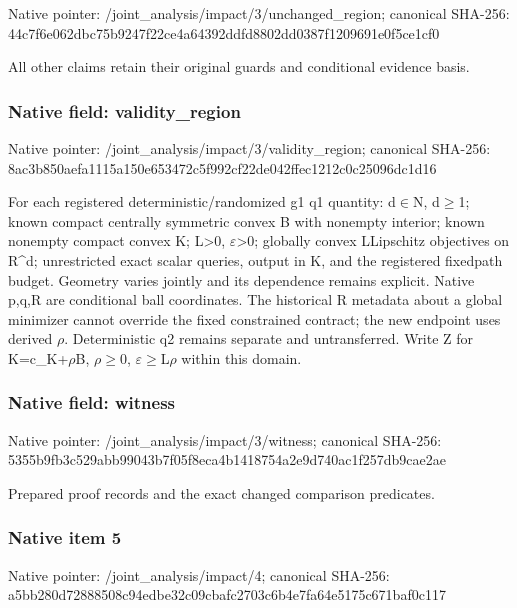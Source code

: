 \documentclass[10pt,a4paper]{article}
\begin{document}
Native pointer: /joint\_analysis/impact/3\allowbreak{}/unchanged\_region; canonical SHA-256: 44c7f6e062dbc75b9247f22c\allowbreak{}e4a64392ddfd8802dd0387f1\allowbreak{}209691e0f5ce1cf0


All other claims retain their original guards and conditional evidence basis.


\subsubsection{Native field: validity\_region}


Native pointer: /joint\_analysis/impact/3\allowbreak{}/validity\_region; canonical SHA-256: 8ac3b850aefa1115a150e653\allowbreak{}472c5f992cf22de042ffec12\allowbreak{}12c0c25096dc1d16


For each registered deterministic/randomized g1 q1 quantity: d\ensuremath{\in}N, d\ensuremath{\ge}1; known compact centrally symmetric convex B with nonempty interior; known nonempty compact convex K; L>0, \ensuremath{\varepsilon}>0; globally convex LLipschitz objectives on R\textasciicircum{}d; unrestricted exact scalar queries, output in K, and the registered fixedpath budget. Geometry varies jointly and its dependence remains explicit. Native p,q,R are conditional ball coordinates. The historical R metadata about a global minimizer cannot override the fixed constrained contract; the new endpoint uses derived \ensuremath{\rho}. Deterministic q2 remains separate and untransferred. Write Z for K=c\_K+\ensuremath{\rho}B, \ensuremath{\rho}\ensuremath{\ge}0, \ensuremath{\varepsilon}\ensuremath{\ge}L\ensuremath{\rho} within this domain.


\subsubsection{Native field: witness}


Native pointer: /joint\_analysis/impact/3/witness; canonical SHA-256: 5355b9fb3c529abb99043b7f\allowbreak{}05f8eca4b1418754a2e9d740\allowbreak{}ac1f257db9cae2ae


Prepared proof records and the exact changed comparison predicates.


\subsubsection{Native item 5}


Native pointer: /joint\_analysis/impact/4; canonical SHA-256: a5bb280d72888508c94edbe3\allowbreak{}2c09cbafc2703c6b4e7fa64e\allowbreak{}5175c671baf0c117
\end{document}
